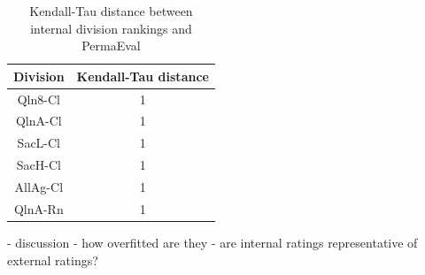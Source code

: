 \begin{table}[H]
\centering
\begin{tabular}{|| c | c ||} 
 \hline
 Division & Kendall-Tau distance \\ [0.5ex] 
 \hline\hline
     Qln8-Cl & 1 \\
     QlnA-Cl & 1 \\
     SacL-Cl & 1 \\
     SacH-Cl & 1 \\
     AllAg-Cl & 1 \\
     QlnA-Rn & 1 \\ [1ex] 
 \hline
\end{tabular}
\label{DivisionInternalExternal}
\caption{Kendall-Tau distance between internal division rankings and PermaEval}
\end{table}

\begin{code}
    - discussion
    - how overfitted are they
    - are internal ratings representative of external ratings?
\end{code}


